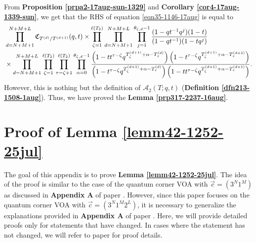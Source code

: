 \documentclass[12pt,reqno,a4paper]{amsart}
\newcommand{\cals}[1]{\mathcal{#1}}
\newcommand{\fraks}[1]{\mathfrak{#1}}
\numberwithin{equation}{section}
\theoremstyle{definition}
\begin{document}
From \textbf{Proposition \ref{prpa2-17aug-sun-1329}} and \textbf{Corollary \ref{cor4-17aug-1339-sun}}, we get that the RHS of equation \eqref{eqn35-1146-17aug} is equal to 
\begin{align}
	& 
	\prod_{d = N+M+1}^{N+M+L}\fraks{C}_{T^{(d)}/T^{(d+1)}}(q,t)
	\times 
	\prod_{\zeta = 1}^{\ell(T_2)}
	\prod_{d = N+M+1}^{N+M+L}
	\prod_{j = 1}^{\theta_{\zeta,d} - 1}
	\frac{
		(1 - qt^{-1}q^{ j})(1 - t)
	}{
		(1 - qt^{-1})(1 - tq^{ j})
	}
	\\
	&\times
	\prod_{d = N+M+1}^{N+M+L} 
	\prod_{\zeta = 1}^{\ell(T_2)}
	\prod_{\tau = \zeta + 1}^{\ell(T_2)} 
	\prod_{\alpha = 0}^{\theta_{\zeta,d} - 1}
	\frac{
		\left(		1 - t t^{\tau - \zeta} q^{ T^{(d+1)}_{\zeta} + \alpha	 -	T^{(d)}_{\tau}			}					\right)
		\left(
		1 - t^{\tau - \zeta} q^{ T^{(d+1)}_{\zeta} + \alpha	-	T^{(d+1)}_{\tau}			}	
		\right)
	}{
		\left(
		1 - t^{\tau - \zeta} q^{ T^{(d+1)}_{\zeta} + \alpha	 -	T^{(d)}_{\tau} 		}	
		\right)
		\left(		1 - t t^{\tau - \zeta} q^{	T^{(d+1)}_{\zeta} + \alpha	 - T^{(d+1)}_{\tau}			}					\right)
	}.
	\notag 
\end{align}
However, this is nothing but the definition of $\cals{A}_2(T;q,t)$ (\textbf{Definition \ref{dfn213-1508-1aug}}). Thus, we have proved the \textbf{Lemma \ref{prp317-2237-16aug}}. 

\section{Proof of Lemma \ref{lemm42-1252-25jul}}
\label{appA-1254}

The goal of this appendix is to prove \textbf{Lemma \ref{lemm42-1252-25jul}}. The idea of the proof is similar to the case of the quantum corner VOA with $\vec{c} = (3^N1^M)$ as discussed in \textbf{Appendix A} of paper \cite{CSW2025}. However, since this paper focuses on the quantum corner VOA with $\vec{c} = (3^N1^M2^L)$, it is necessary to generalize the explanations provided in \textbf{Appendix A} of paper \cite{CSW2025}. Here, we will provide detailed proofs only for statements that have changed. In cases where the statement has not changed, we will refer to paper \cite{CSW2025} for proof details. 
\end{document}
